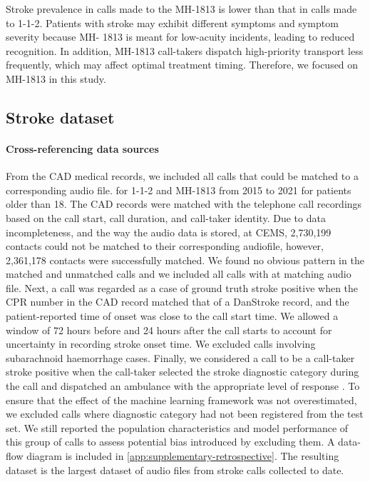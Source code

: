 {Stroke prevalence in calls made to the MH-1813 is lower than that in calls made to 1-1-2. Patients with stroke may exhibit different symptoms and symptom severity because MH- 1813 is meant for low-acuity incidents, leading to reduced recognition. In addition, MH-1813 call-takers dispatch high-priority transport less frequently, which may affect optimal treatment timing. Therefore, we focused on MH-1813 in this study.

\subsection{Stroke dataset}

\paragraph{Cross-referencing data sources}

From the CAD medical records, we included all calls that could be matched to a corresponding audio file. for 1-1-2 and MH-1813 from 2015 to 2021 for patients older than 18. The CAD records were matched with the telephone call recordings based on the call start, call duration, and call-taker identity. Due to data incompleteness, and the way the audio data is stored, at CEMS, 2,730,199 contacts could not be matched to their corresponding audiofile, however, 2,361,178 contacts were successfully matched. We found no obvious pattern in the matched and unmatched calls and we included all calls with at matching audio file. Next, a call was regarded as a case of ground truth stroke positive when the CPR number in the CAD record matched that of a DanStroke record, and the patient-reported time of onset was close to the call start time. We allowed a window of 72 hours before and 24 hours after the call starts to account for uncertainty in recording stroke onset time. We excluded calls involving subarachnoid haemorrhage cases. Finally, we considered a call to be a call-taker stroke positive when the call-taker selected the stroke diagnostic category during the call and dispatched an ambulance with the appropriate level of response \cite{cite20}. To ensure that the effect of the machine learning framework was not overestimated, we excluded calls where diagnostic category had not been registered from the test set. We still reported the population characteristics and model performance of this group of calls to assess potential bias introduced by excluding them. A data-flow diagram is included in \cref{app:supplementary-retrospective}. The resulting dataset is the largest dataset of audio files from stroke calls collected to date.

}
